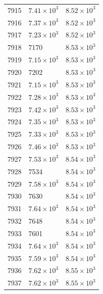 \begin{table}[H]
\begin{tabular}{lll}
7915 & $\displaystyle 7.41 \times 10^{3}$ & $\displaystyle 8.52 \times 10^{3}$ \\
7916 & $\displaystyle 7.37 \times 10^{3}$ & $\displaystyle 8.52 \times 10^{3}$ \\
7917 & $\displaystyle 7.23 \times 10^{3}$ & $\displaystyle 8.52 \times 10^{3}$ \\
7918 & 7170 & $\displaystyle 8.53 \times 10^{3}$ \\
7919 & $\displaystyle 7.15 \times 10^{3}$ & $\displaystyle 8.53 \times 10^{3}$ \\
7920 & 7202 & $\displaystyle 8.53 \times 10^{3}$ \\
7921 & $\displaystyle 7.15 \times 10^{3}$ & $\displaystyle 8.53 \times 10^{3}$ \\
7922 & $\displaystyle 7.28 \times 10^{3}$ & $\displaystyle 8.53 \times 10^{3}$ \\
7923 & $\displaystyle 7.42 \times 10^{3}$ & $\displaystyle 8.53 \times 10^{3}$ \\
7924 & $\displaystyle 7.35 \times 10^{3}$ & $\displaystyle 8.53 \times 10^{3}$ \\
7925 & $\displaystyle 7.33 \times 10^{3}$ & $\displaystyle 8.53 \times 10^{3}$ \\
7926 & $\displaystyle 7.46 \times 10^{3}$ & $\displaystyle 8.53 \times 10^{3}$ \\
7927 & $\displaystyle 7.53 \times 10^{3}$ & $\displaystyle 8.54 \times 10^{3}$ \\
7928 & 7534 & $\displaystyle 8.54 \times 10^{3}$ \\
7929 & $\displaystyle 7.58 \times 10^{3}$ & $\displaystyle 8.54 \times 10^{3}$ \\
7930 & 7630 & $\displaystyle 8.54 \times 10^{3}$ \\
7931 & $\displaystyle 7.64 \times 10^{3}$ & $\displaystyle 8.54 \times 10^{3}$ \\
7932 & 7648 & $\displaystyle 8.54 \times 10^{3}$ \\
7933 & 7601 & $\displaystyle 8.54 \times 10^{3}$ \\
7934 & $\displaystyle 7.64 \times 10^{3}$ & $\displaystyle 8.54 \times 10^{3}$ \\
7935 & $\displaystyle 7.59 \times 10^{3}$ & $\displaystyle 8.54 \times 10^{3}$ \\
7936 & $\displaystyle 7.62 \times 10^{3}$ & $\displaystyle 8.55 \times 10^{3}$ \\
7937 & $\displaystyle 7.62 \times 10^{3}$ & $\displaystyle 8.55 \times 10^{3}$ \\

\end{tabular}
\end{table}
